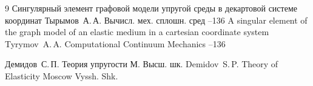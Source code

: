 \begin{thebibliography}{9}
\paper Сингулярный элемент графовой модели упругой среды в декартовой системе координат
\by Тырымов~А.\,А.
\jour Вычисл. мех. сплошн. сред
--136
\misctransl
\paper A singular element of the graph model of an elastic medium in a cartesian coordinate system
\by Tyrymov~A.\,A.
\jour Computational Continuum Mechanics
--136



\by Демидов~С.\,П.
\book Теория упругости
\publaddr М.
\publ Высш. шк.
\misctransl 
\by Demidov~S.\,P.
\book Theory of Elasticity 
\publaddr Moscow 
\publ Vyssh. Shk.

\end{thebibliography}



\noindent
\hskip6.5cm \thedate \par\noindent
\hskip6.5cm\therevdate

%

\makeengtitlem



 \newpage
%
%
%
